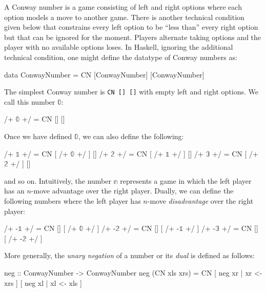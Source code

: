 \documentclass[authoryear,preprint]{sigplanconf}
\newcommand{\zerog}{\mathbb{0}}
\newcommand{\oneg}{\mathbb{1}}
\newcommand{\twog}{\mathbb{2}}
\newcommand{\threeg}{\mathbb{3}}
\begin{document}
A Conway number is a game consisting of left and right options where each
option models a move to another game. There is another technical condition
given below that constrains every left option to be ``less than'' every right
option but that can be ignored for the moment. Players alternate taking
options and the player with no available options loses. In Haskell, ignoring
the additional technical condition, one might define the datatype of Conway
numbers as:
\begin{code}
data ConwayNumber = CN [ConwayNumber] [ConwayNumber]
\end{code}
The simplest Conway number is \lstinline|CN [] []| with empty left and right
options. We call this number $\zerog$: 
\begin{code}
/+ $\zerog$ +/  = CN  [] []
\end{code}
Once we have defined $\zerog$, we can also define the following:
\begin{code}
/+ $\oneg$ +/  = CN  [ /+ $\zerog$ +/ ]  []
/+ $\twog$ +/  = CN  [ /+ $\oneg$ +/ ]  []
/+ $\threeg$ +/  = CN  [ /+ $\twog$ +/ ]  []
\end{code}
and so on. Intuitively, the number $\mathbb{n}$ represents a game in which
the left player has an $n$-move advantage over the right player. Dually, we
can define the following numbers where the left player has $n$-move
\emph{disadvantage} over the right player:
\begin{code}
/+ -$\oneg$ +/  = CN  [] [ /+ $\zerog$ +/ ]
/+ -$\twog$ +/  = CN  [] [ /+ -$\oneg$ +/ ]
/+ -$\threeg$ +/  = CN  [] [ /+ -$\twog$ +/ ]
\end{code}
More generally, the \emph{unary negation} of a number or its \emph{dual} is
defined as follows:
\begin{code}
neg :: ConwayNumber -> ConwayNumber
neg (CN xls xrs) = 
  CN [ neg xr | xr <- xrs ] [ neg xl | xl <- xls ]
\end{code}
\end{document}
